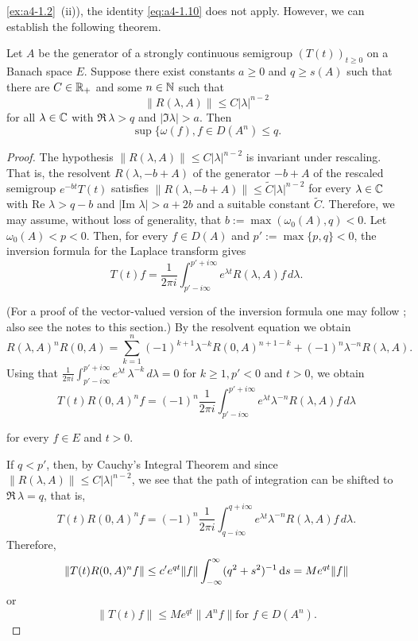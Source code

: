 \ref{ex:a4-1.2}~(ii)), the identity \eqref{eq:a4-1.10} does not apply. 
However, we can establish the following theorem.
\begin{theorem}\label{thm:a4-1.9} 
Let $A$ be the generator of a strongly continuous semigroup $(T(t))_{t \geq 0}$ on a Banach space $E$. 
Suppose there exist constants $a \geq 0$ and $q \geq s(A)$ such that there are $C \in \mathbb{R}_+$ and some $n \in \mathbb{N}$ such that 
\[
    \| R(\lambda, A) \| \leq C | \lambda |^{n-2}
\]
for all $\lambda \in \mathbb{C}$ with $\Re\,\lambda > q$ and $| \Im \lambda | > a$. 
Then
\[
    \sup \{ \omega(f),  f \in D(A^n)  \leq q.
\]
\end{theorem}
\begin{proof} 
The hypothesis $\| R(\lambda, A) \| \leq C | \lambda |^{n-2}$ is invariant under rescaling. 
That is, the resolvent $R(\lambda, -b+A)$ of the generator $-b+A$ of the rescaled semigroup $e^{-bt} T(t)$ satisfies  
$\| R(\lambda, -b+A) \| \leq \tilde{C} | \lambda |^{n-2}$ for every $\lambda \in \mathbb{C}$ with $\text{Re } \lambda > q-b$ and $| \text{Im } \lambda | > a+2b$ and a suitable constant $\tilde{C}$. 
Therefore, we may assume, without loss of generality, that $b := \max(\omega_{0}(A), q) < 0$. 
Let $\omega_{0}(A) < p < 0$. 
Then, for every $f \in D(A)$ and $p' := \max\{p, q\} < 0$, the inversion formula for the Laplace transform gives 
\begin{equation} \label{eq:a4-1.12}
T(t) f = \frac{1}{2\pi i} \int_{p' - i\infty}^{p' + i\infty} e^{\lambda t} R(\lambda, A) f \, d\lambda.
\end{equation}

 (For a proof of the vector-valued version of the inversion formula one may follow \citet[p.66]{widder:1946}; also see the notes to this section.)
By the resolvent equation we obtain 
\[ 
R(\lambda, A)^n R(0, A) = \sum_{k=1}^{n} (-1)^{k+1} \lambda^{-k} R(0, A)^{n+1-k} + (-1)^n \lambda^{-n} R(\lambda, A).
\]
Using that  
$ \frac {1}{2\pi i} \int_{p' - i\infty}^{p' + i\infty} e^{\lambda t} \, \lambda^{-k} \, d\lambda = 0 $ for $ k \geq 1, p' < 0 $ and $ t > 0$, we obtain
 \begin{equation}\label{eq:a4-1.13}
   T(t) R(0, A)^n f = (-1)^n \frac{1}{2\pi i} \int_{p' - i\infty}^{p' + i\infty} e^{\lambda t} \lambda^{-n} R(\lambda, A) f \, d\lambda
    \end{equation}
    
 for every $f \in E$ and $t > 0$.
    
 If $q < p'$, then, by Cauchy's Integral Theorem and since $\| R(\lambda, A) \| \leq C | \lambda |^{n-2}$, we see that the path of integration can be shifted to 
 $\Re \, \lambda = q$, that is,
\[
    T(t) R(0, A)^n f = (-1)^n \frac{1}{2\pi i} \int_{q - i\infty}^{q + i\infty} e^{\lambda t} \lambda^{-n} R(\lambda, A) f \, d\lambda.
\]
Therefore,  
\[
\| T(t) R(0,A)^n f \| \leq c' e^{q t} \| f \| \int_{-\infty}^{\infty} (q^2 + s^2)^{-1}\mathop{}\!\mathrm{d}{s} = M e^{q t} \| f \|
\]
or 
\[
\| T(t) f \| \leq M e^{q t} \| A^n f \| \text{for $f \in D(A^n)$.}
\]
\end{proof}
